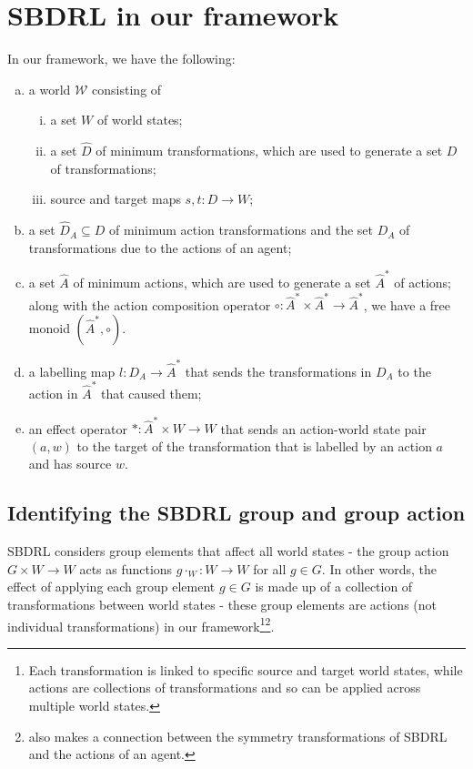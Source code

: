 \section{SBDRL in our framework}

In our framework, we have the following:
\begin{enumerate}[(a)]
    \item a world $\mathscr{W}$ consisting of
    \begin{enumerate}[(i)]
        \item a set $W$ of world states;
        \item a set $\hat{D}$ of minimum transformations, which are used to generate a set $D$ of transformations;
        \item source and target maps $s, t: D \to W$;
    \end{enumerate}

    \item a set $\hat{D}_{A} \subseteq D$ of minimum action transformations and the set $D_{A}$ of transformations due to the actions of an agent;
    \item a set $\hat{A}$ of minimum actions, which are used to generate a set $\hat{A}^{\ast}$ of actions; along with the action composition operator $\circ: \hat{A}^{*} \times \hat{A}^{*} \to \hat{A}^{*}$, we have a free monoid $(\hat{A}^{*}, \circ)$.
    \item a labelling map $l: D_{A} \to \hat{A}^{\ast}$ that sends the transformations in $D_{A}$ to the action in $\hat{A}^{\ast}$ that caused them;
    \item an effect operator $\ast : \hat{A}^{*} \times W \to W$ that sends an action-world state pair $(a, w)$ to the target of the transformation that is labelled by an action $a$ and has source $w$.
\end{enumerate}

\subsection{Identifying the SBDRL group and group action}

SBDRL considers group elements that affect all world states - the group action $G \times W \to W$ acts as functions $g \cdot_{W}: W \to W$ for all $g \in G$.
In other words, the effect of applying each group element $g \in G$ is made up of a collection of transformations between world states - these group elements are actions (not individual transformations) in our framework\footnote{
Each transformation is linked to specific source and target world states, while actions are collections of transformations and so can be applied across multiple world states.
}\footnote{
\autocite{caselles2019symmetry} also makes a connection between the symmetry transformations of SBDRL and the actions of an agent.
}.

